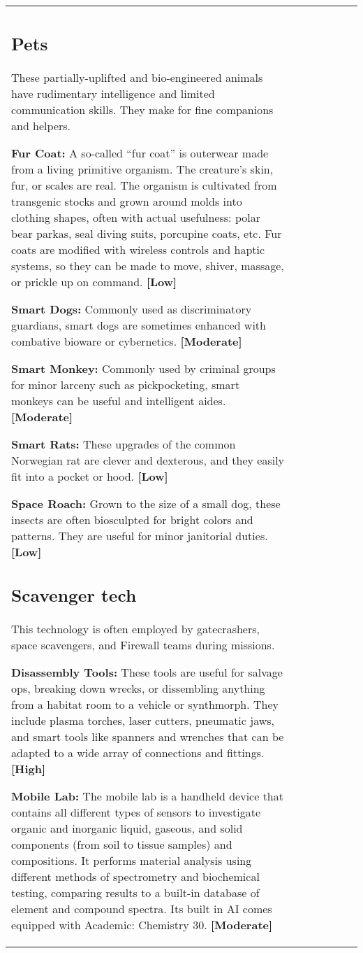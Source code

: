 \begin{tabular}{|l|l|l|l|l|l|l|}
\subsection{Pets} \label{sec:pets} 

These partially-uplifted and bio-engineered animals have rudimentary intelligence and limited communication skills. They make for fine companions and helpers. 

\textbf{Fur Coat:} A so-called ``fur coat'' is outerwear made from a living primitive organism. The creature’s skin, fur, or scales are real. The organism is cultivated from transgenic stocks and grown around molds into clothing shapes, often with actual usefulness: polar bear parkas, seal diving suits, porcupine coats, etc. Fur coats are modified with wireless controls and haptic systems, so they can be made to move, shiver, massage, or prickle up on command. \textbf{[Low]} 

\textbf{Smart Dogs:} Commonly used as discriminatory guardians, smart dogs are sometimes enhanced with combative bioware or cybernetics. \textbf{[Moderate]} 

\textbf{Smart Monkey:} Commonly used by criminal groups for minor larceny such as pickpocketing, smart monkeys can be useful and intelligent aides. \textbf{[Moderate]} 

\textbf{Smart Rats:} These upgrades of the common Norwegian rat are clever and dexterous, and they easily fit into a pocket or hood. \textbf{[Low]} 

\textbf{Space Roach:} Grown to the size of a small dog, these insects are often biosculpted for bright colors and patterns. They are useful for minor janitorial duties. \textbf{[Low]} 

\subsection{Scavenger tech} \label{sec:scavenger-tech} 

This technology is often employed by gatecrashers, space scavengers, and Firewall teams during missions. 

\textbf{Disassembly Tools:} These tools are useful for salvage ops, breaking down wrecks, or dissembling anything from a habitat room to a vehicle or synthmorph. They include plasma torches, laser cutters, pneumatic jaws, and smart tools like spanners and wrenches that can be adapted to a wide array of connections and fittings. \textbf{[High]} 

\textbf{Mobile Lab:} The mobile lab is a handheld device that contains all different types of sensors to investigate organic and inorganic liquid, gaseous, and solid components (from soil to tissue samples) and compositions. It performs material analysis using different methods of spectrometry and biochemical testing, comparing results to a built-in database of element and compound spectra. Its built in AI comes equipped with Academic: Chemistry 30. \textbf{[Moderate]} 


\end{tabular}
